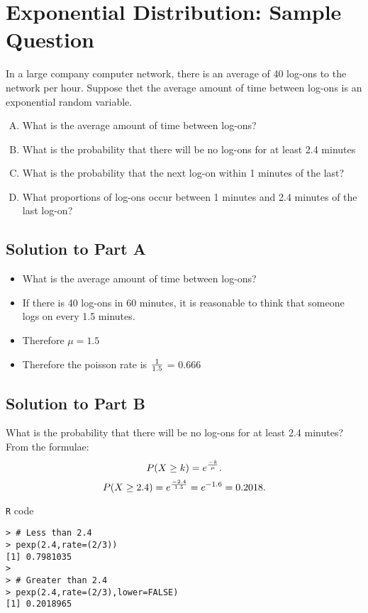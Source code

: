 \documentclass[a4paper,12pt]{article}
\begin{document}
\section*{Exponential Distribution: Sample Question}

In a large company computer network, there is an average of 40 log-ons to the network per hour. Suppose thet the average amount of time between log-ons is an exponential random variable.
\begin{enumerate}[(A)]
\item What is the average amount of time between log-ons?
\item What is the probability that there will be no log-ons for at least 2.4 minutes
\item What is the probability that the next log-on within 1 minutes of the last?
\item What proportions of log-ons occur between 1 minutes and 2.4 minutes of the last log-on?
\end{enumerate}

\subsection*{Solution to Part A }


\begin{itemize} \item What is the average amount of time between log-ons?

\item If there is 40 log-ons in 60 minutes, it is reasonable to think that someone logs on every 1.5 minutes.
\item Therefore $\mu = 1.5$
\item Therefore the poisson rate is ${1\over1.5}$ = 0.666
\end{itemize}

\subsection*{Solution to Part B}


What is the probability that there will be no log-ons for at least 2.4 minutes?\\
From the formulae:
\[
P( X \geq k) = e^{{-k \over \mu}} .
\]
\[
P( X \geq 2.4) = e^{{-2.4 \over 1.5}} = e^{-1.6} = 0.2018.
\]

\begin{framed}
\noindent \texttt{R} code 
\begin{verbatim}
> # Less than 2.4
> pexp(2.4,rate=(2/3))
[1] 0.7981035
> 
> # Greater than 2.4
> pexp(2.4,rate=(2/3),lower=FALSE)
[1] 0.2018965

\end{verbatim}
\end{framed}
\end{document}
